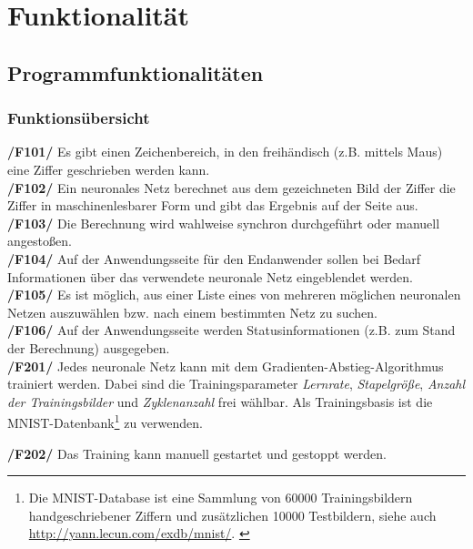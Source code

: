 \section{Funktionalität}

\subsection{Programmfunktionalitäten}
\subsubsection{Funktionsübersicht}

\textbf{/F101/} Es gibt einen Zeichenbereich, in den freihändisch (z.B. mittels Maus) eine Ziffer geschrieben werden kann.\\[-0.2cm]

\textbf{/F102/} Ein neuronales Netz berechnet aus dem gezeichneten Bild der Ziffer die Ziffer in maschinenlesbarer Form und gibt das Ergebnis auf der Seite aus. \\[-0.2cm]

\textbf{/F103/} Die Berechnung wird wahlweise synchron durchgeführt oder manuell angestoßen.\\[-0.2cm]

\textbf{/F104/} Auf der Anwendungsseite für den Endanwender sollen bei Bedarf Informationen über das verwendete neuronale Netz eingeblendet werden.\\[-0.2cm]

\textbf{/F105/} Es ist möglich, aus einer Liste eines von mehreren möglichen neuronalen Netzen auszuwählen bzw. nach einem bestimmten Netz zu suchen. \\[-0.2cm]

\textbf{/F106/} Auf der Anwendungsseite werden Statusinformationen (z.B. zum Stand der Berechnung) ausgegeben. \\[-0.2cm]

\textbf{/F201/} Jedes neuronale Netz kann mit dem Gradienten-Abstieg-Algorithmus trainiert werden. Dabei sind die Trainingsparameter \emph{Lernrate}, \emph{Stapelgröße}, \emph{Anzahl der Trainingsbilder} und \emph{Zyklenanzahl} frei wählbar. Als Trainingsbasis ist die MNIST-Datenbank\footnote{Die MNIST-Database ist eine Sammlung von 60000 Trainingsbildern handgeschriebener Ziffern und zusätzlichen 10000 Testbildern, siehe auch \url{http://yann.lecun.com/exdb/mnist/}. \label{footnote_mnist}} zu verwenden.

\textbf{/F202/} Das Training kann manuell gestartet und gestoppt werden.\\[-0.2cm]

